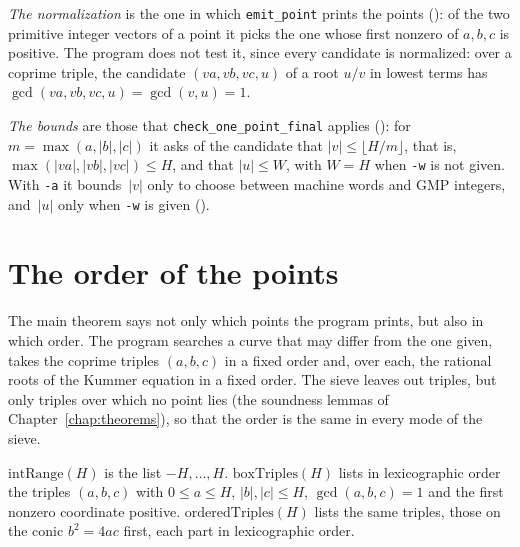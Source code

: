 \begin{remark}\label{rem:specPointsC}
  \emph{The normalization} is the one in which \texttt{emit\_point} prints the points
  (): of the two primitive integer vectors of a point it picks the
  one whose first nonzero of $a, b, c$ is positive. The program does not test it, since every
  candidate is normalized: over a coprime triple, the candidate $(v a, v b, v c, u)$ of a root
  $u/v$ in lowest terms has $\gcd(v a, v b, v c, u) = \gcd(v, u) = 1$.

  \emph{The bounds} are those that \texttt{check\_one\_point\_final} applies
  (): for $m = \max(a, |b|, |c|)$ it asks of the candidate that
  $|v| \le \lfloor H/m \rfloor$, that is, $\max(|v a|, |v b|, |v c|) \le H$, and that
  $|u| \le W$, with $W = H$ when \texttt{-w} is not given. With \texttt{-a} it bounds~$|v|$ only to
  choose between machine words and GMP integers, and~$|u|$ only when \texttt{-w} is given
  ().
\end{remark}

\section{The order of the points}\label{sec:specOrder}

The main theorem says not only which points the program prints, but also in which order. The
program searches a curve that may differ from the one given, takes the coprime triples $(a, b, c)$
in a fixed order and, over each, the rational roots of the Kummer equation in a fixed order. The
sieve leaves out triples, but only triples over which no point lies (the soundness lemmas of
Chapter~\ref{chap:theorems}), so that the order is the same in every mode of the sieve.

\begin{definition}\label{def:orderedTriples}
  \leanok
  $\mathrm{intRange}(H)$ is the list $-H, \dots, H$. $\mathrm{boxTriples}(H)$ lists in
  lexicographic order the triples $(a, b, c)$ with $0 \le a \le H$, $|b|, |c| \le H$,
  $\gcd(a, b, c) = 1$ and the first nonzero coordinate positive. $\mathrm{orderedTriples}(H)$
  lists the same triples, those on the conic $b^2 = 4ac$ first, each part in lexicographic order.
\end{definition}


